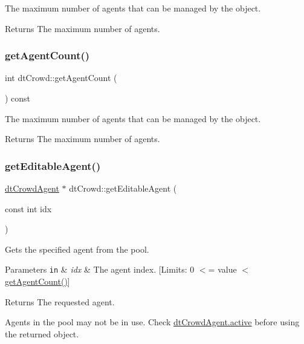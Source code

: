 The maximum number of agents that can be managed by the object. \begin{DoxyReturn}{Returns}
The maximum number of agents. 
\end{DoxyReturn}
\mbox{\label{classdtCrowd_a87dc2372038ee12d9043a65737880b78}} 
\subsubsection{\texorpdfstring{get\+Agent\+Count()}{getAgentCount()}\hspace{0.1cm}{\footnotesize\ttfamily [2/2]}}
{\footnotesize\ttfamily int dt\+Crowd\+::get\+Agent\+Count (\begin{DoxyParamCaption}{ }\end{DoxyParamCaption}) const}

The maximum number of agents that can be managed by the object. \begin{DoxyReturn}{Returns}
The maximum number of agents. 
\end{DoxyReturn}
\mbox{\label{classdtCrowd_aa6b571af2a8c628063b904c7b1a5e910}} 
\subsubsection{\texorpdfstring{get\+Editable\+Agent()}{getEditableAgent()}\hspace{0.1cm}{\footnotesize\ttfamily [1/2]}}
{\footnotesize\ttfamily \hyperlink{structdtCrowdAgent}{dt\+Crowd\+Agent} $\ast$ dt\+Crowd\+::get\+Editable\+Agent (\begin{DoxyParamCaption}\item[{const int}]{idx }\end{DoxyParamCaption})}

Gets the specified agent from the pool. 
\begin{DoxyParams}[1]{Parameters}
\mbox{\tt in}  & {\em idx} & The agent index. \mbox{[}Limits\+: 0 $<$= value $<$ \hyperlink{classdtCrowd_a87dc2372038ee12d9043a65737880b78}{get\+Agent\+Count()}\mbox{]} \\
\hline
\end{DoxyParams}
\begin{DoxyReturn}{Returns}
The requested agent.
\end{DoxyReturn}
Agents in the pool may not be in use. Check \hyperlink{structdtCrowdAgent_a6473f48354abf6f46f5b4d7ead9bca20}{dt\+Crowd\+Agent.\+active} before using the returned object. \mbox{\label{classdtCrowd_af0f5a42f9d7fe60370a7f682cd0089d0}} 
